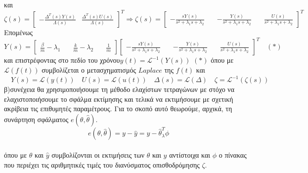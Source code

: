 \documentclass[12pt]{article}
\newcommand{\Lagr}{\mathcal{L}}
\begin{document}
και
\newline
\newline
$
\zeta(s)=\begin{bmatrix}
		-\frac{\Delta^{T}(s)Y(s)}{\Lambda(s)} & \frac{\Delta^{T}(s)U(s)}{\Lambda(s)}
\end{bmatrix}^{T}\Rightarrow
\zeta(s)=\begin{bmatrix}
		-\frac{sY(s)}{s^{2}+\lambda_{1}s+\lambda_{2}} \quad &  -\frac{Y(s)}{s^{2}+\lambda_{1}s+\lambda_{2}} \quad &  \frac{U(s)}{s^{2}+\lambda_{1}s+\lambda_{2}}
\end{bmatrix}^{T}$
\newline
\newline
\newline
\newline
Επομένως \quad $Y(s)=
\begin{bmatrix}
		\frac{β}{m}-\lambda_{1} \quad &  \frac{k}{m}-\lambda_{2} \quad &  \frac{1}{m}
\end{bmatrix}
\begin{bmatrix}
		-\frac{sY(s)}{s^{2}+\lambda_{1}s+\lambda_{2}} \quad &  -\frac{Y(s)}{s^{2}+\lambda_{1}s+\lambda_{2}} \quad &  \frac{U(s)}{s^{2}+\lambda_{1}s+\lambda_{2}}
\end{bmatrix}^{T}  \quad (*)$ 
\newline
\newline
και επιστρέφοντας στο πεδίο του χρόνου\quad $y(t)=\Lagr^{-1}(Y(s))$ 
\newline
\newline
$(*)$ όπου με $\Lagr(f(t))$ συμβολίζεται ο μετασχηματισμός $Laplace$ της $f(t)$ και
\newline
$\quad Y(s)= \Lagr(y(t)) \quad U(s)= \Lagr(u(t)) \quad \Delta(s)= \Lagr(\Delta) \quad \zeta= \Lagr^{-1}(\zeta(s))$
\newline
\newline
\newline
\newline
β) συνέχεια θα χρησιμοποιήσουμε τη μέθοδο ελαχίστων τετραγώνων με στόχο να ελαχιστοποιήσουμε το σφάλμα εκτίμησης και τελικά να εκτιμήσουμε με σχετική ακρίβεια τις επιθυμητές παραμέτρους. Για το σκοπό αυτό θεωρούμε, αρχικά, τη συνάρτηση σφάλματος $e(\theta,\hat{\theta})$.
\\
\[e(\theta,\hat{\theta})=y-\hat{y}=y-\hat{\theta}^{T}_{\lambda}\phi\]
\\
 όπου με $\hat{\theta}$ και $\hat{y}$ συμβολίζονται οι εκτιμήσεις των $\theta$ και $y$ αντίστοιχα και $\phi$ ο πίνακας που περιέχει τις αριθμητικές τιμές του διανύσματος οπισθοδρόμησης $\zeta$.
\end{document}
